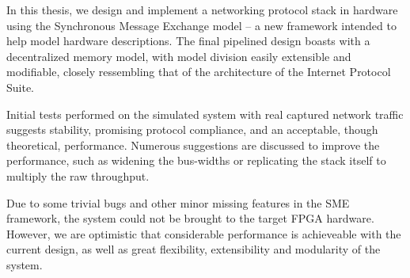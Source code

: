In this thesis, we design and implement a networking protocol stack in hardware
using the Synchronous Message Exchange model -- a new framework intended to
help model hardware descriptions.  The final pipelined design boasts with
a decentralized memory model, with model division easily extensible and
modifiable, closely ressembling that of the architecture of the Internet
Protocol Suite.

Initial tests performed on the simulated system with real captured network
traffic suggests stability, promising protocol compliance, and an acceptable, though
theoretical, performance. Numerous suggestions are discussed to improve the performance,
such as widening the bus-widths or replicating the stack itself to multiply the
raw throughput.

Due to some trivial bugs and other minor missing features in the SME framework,
the system could not be brought to the target FPGA hardware. However, we are
optimistic that considerable performance is achieveable with the current design,
as well as great flexibility, extensibility and modularity of the system.


